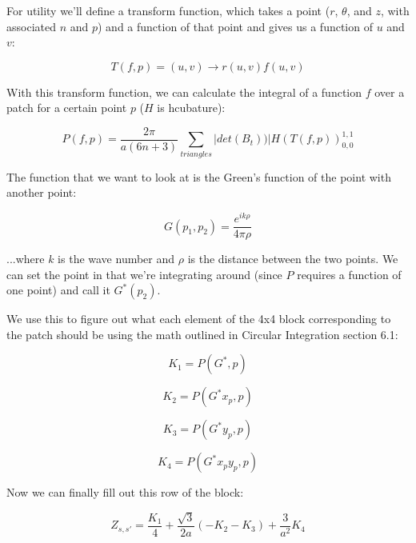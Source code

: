 \documentclass[etd,oneside,senior]{BYUPhys}
\begin{document}
For utility we'll define a transform function, which takes a point
($r$, $\theta$, and $z$, with associated $n$ and $p$) and a function
of that point and gives us a function of $u$ and $v$:

\begin{equation}
  T\left(f,p\right)=\left(u,v\right)\rightarrow r\left(u,v\right)f\left(u,v\right)
\end{equation}

With this transform function, we can calculate the integral of a function
$f$ over a patch for a certain point $p$ ($H$ is hcubature):

\begin{equation}
  P\left(f,p\right)=\frac{2\pi}{a\left(6n+3\right)}\sum_{triangles}|det\left(B_{t}\right))|H\left(T\left(f,p\right)\right)_{0,0}^{1,1}
\end{equation}

The function that we want to look at is the Green's function of the
point with another point:

\begin{equation}
  G\left(p_{1},p_{2}\right)=\frac{e^{ik\rho}}{4\pi\rho}
\end{equation}

...where $k$ is the wave number and $\rho$ is the distance between
the two points. We can set the point in that we're integrating around
(since $P$ requires a function of one point) and call it $G^{*}\left(p_{2}\right)$.

We use this to figure out what each element of the 4x4 block corresponding
to the patch should be using the math outlined in Circular Integration
section 6.1:

\begin{equation}
  K_{1}=P\left(G^{*},p\right)
\end{equation}

\begin{equation}
  K_{2}=P\left(G^{*}x_{p},p\right)
\end{equation}

\begin{equation}
  K_{3}=P\left(G^{*}y_{p},p\right)
\end{equation}

\begin{equation}
  K_{4}=P\left(G^{*}x_{p}y_{p},p\right)
\end{equation}

Now we can finally fill out this row of the block:

\begin{equation}
  Z_{s,s'}=\frac{K_{1}}{4}+\frac{\sqrt{3}}{2a}\left(-K_{2}-K_{3}\right)+\frac{3}{a^{2}}K_{4}
\end{equation}
\end{document}
